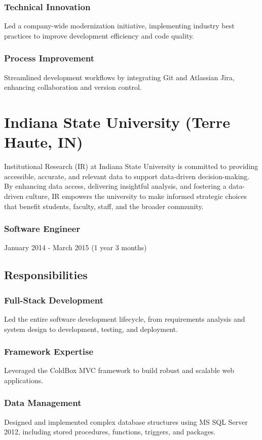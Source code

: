\documentclass[letterpaper,9pt]{article}
\begin{document}
    \subsubsection{Technical Innovation}{Led a company-wide modernization initiative, implementing industry best practices to improve development efficiency and code quality.}
    \subsubsection{Process Improvement}{Streamlined development workflows by integrating Git and Atlassian Jira, enhancing collaboration and version control.}

    \pagebreak


    \section{Indiana State University (Terre Haute, IN)}{
	Institutional Research (IR) at Indiana State University is committed to providing accessible, accurate, and relevant data to support data-driven decision-making. By enhancing data access, delivering insightful analysis, and fostering a data-driven culture, IR empowers the university to make informed strategic choices that benefit students, faculty, staff, and the broader community.}
	\subsubsection{Software Engineer}{January 2014 - March 2015 (1 year 3 months)}
	\subsection{Responsibilities}
	\subsubsection{Full-Stack Development}{Led the entire software development lifecycle, from requirements analysis and system design to development, testing, and deployment.}
	\subsubsection{Framework Expertise}{Leveraged the ColdBox MVC framework to build robust and scalable web applications.}
	\subsubsection{Data Management}{Designed and implemented complex database structures using MS SQL Server 2012, including stored procedures, functions, triggers, and packages.}
\end{document}
